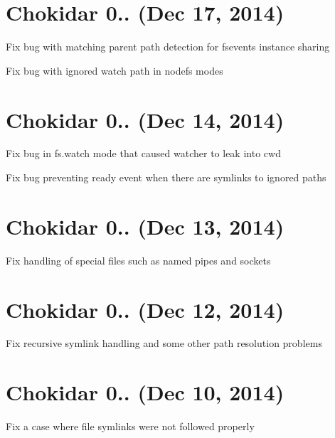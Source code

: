 \section*{Chokidar 0.. (Dec 17, 2014)}


\begin{DoxyItemize}
\item Fix bug with matching parent path detection for fsevents instance sharing
\item Fix bug with ignored watch path in nodefs modes
\end{DoxyItemize}

\section*{Chokidar 0.. (Dec 14, 2014)}


\begin{DoxyItemize}
\item Fix bug in {\ttfamily fs.\+watch} mode that caused watcher to leak into {\ttfamily cwd}
\item Fix bug preventing ready event when there are symlinks to ignored paths
\end{DoxyItemize}

\section*{Chokidar 0.. (Dec 13, 2014)}


\begin{DoxyItemize}
\item Fix handling of special files such as named pipes and sockets
\end{DoxyItemize}

\section*{Chokidar 0.. (Dec 12, 2014)}


\begin{DoxyItemize}
\item Fix recursive symlink handling and some other path resolution problems
\end{DoxyItemize}

\section*{Chokidar 0.. (Dec 10, 2014)}


\begin{DoxyItemize}
\item Fix a case where file symlinks were not followed properly
\end{DoxyItemize}

